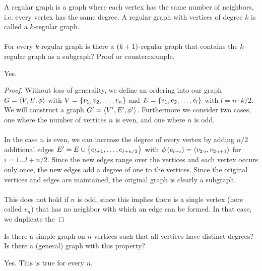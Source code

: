\documentclass{article}
\begin{document}
\begin{exercise}
A regular graph is a graph where each vertex has the same number of neighbors, i.e. every vertex has the same degree. A regular graph with vertices of degree $k$ is called a $k$-regular graph.
\paragraph{}
For every $k$-regular graph is there a $\left( k+1 \right)$-regular graph that contains the $k$-regular graph as a subgraph? Proof or counterexample.
\begin{answer}
Yes.
\begin{proof}
Without loss of generality, we define an ordering into our graph $G=\left\langle V,E,\phi \right\rangle$ with $V=\left\{ v_1,v_2,\ldots,v_n \right\}$ and $E=\left\{ e_1,e_2,\ldots,e_l \right\}$ with $l=n\cdot k/2$. We will construct a graph $G'=\left\langle V',E',\phi' \right\rangle$. Furthermore we consider two cases, one where the number of vertices $n$ is even, and one where $n$ is odd.
\paragraph{}In the case $n$ is even, we can increase the degree of every vertex by adding $n/2$ additional edges $E'=E\cup\left\{ e_{l+1},\ldots,e_{l+n/2} \right\}$ with $\phi\left( e_{l+i} \right)=\left\langle v_{2\cdot i},v_{2\cdot i+1} \right\rangle$ for $i=1\ldots l+n/2$. Since the new edges range over the vertices and each vertex occurs only once, the new edges add a degree of one to the vertices. Since the original vertices and edges are maintained, the original graph is clearly a subgraph.
\paragraph{}This does not hold if $n$ is odd, since this implies there is a single vertex (here called $v_n$) that has no neighbor with which an edge can be formed. In that case, we duplicate the 
\end{proof}
\end{answer}
\end{exercise}

\begin{exercise}
Is there a simple graph on $n$ vertices such that all vertices have distinct degrees? Is there a (general) graph with this property?
\begin{answer}
Yes. This is true for every $n$.
\begin{construction}

\end{construction}
\end{answer}

\end{exercise}
\end{document}
